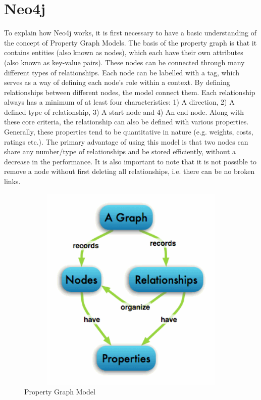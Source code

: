 \section{Neo4j}
To explain how Neo4j works, it is first necessary to have a basic understanding of the concept of Property Graph Models. 
The basis of the property graph is that it contains entities (also known as nodes), which each have their own attributes (also known as key-value pairs). These nodes can be connected through many different types of relationships. Each node can be labelled with a tag, which serves as a way of defining each node’s role within a context.  By defining relationships between different nodes, the model connect them. Each relationship always has a minimum of at least four characteristics: 1) A direction, 2) A defined type of relationship, 3) A start node and 4) An end node. Along with these core criteria, the relationship can also be defined with various properties. Generally, these properties tend to be quantitative in nature (e.g. weights, costs, ratings etc.). The primary advantage of using this model is that two nodes can share any number/type of relationships and be stored efficiently, without a decrease in the performance. It is also important to note that it is not possible to remove a node without first deleting all relationships, i.e. there can be no broken links. 

\begin{figure}[h]
	\caption{Property Graph Model}
	\centering
	\includegraphics[width=15cm, height=10cm]{img/graphdb-propmodel}
\end{figure}

